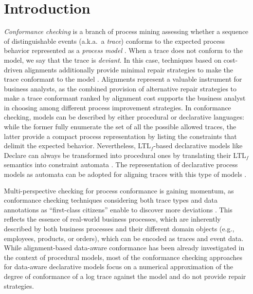 \section{Introduction}
\label{sec:introduction}

\textit{Conformance checking} is a branch of process mining assessing whether a sequence of distinguishable events (a.k.a.\ a \textit{trace}) conforms to the expected process behavior represented as a \textit{process model} \cite{RozinatA08}. When a trace does not conform to the model, we say that the trace is \textit{deviant}. In this case, techniques based on cost-driven alignments additionally provide minimal repair strategies to make the trace conformant to the model \cite{DBLP:conf/edoc/AdriansyahDA11}. Alignments represent a valuable instrument for business analysts, as the combined provision of alternative repair strategies to make a trace conformant ranked by alignment cost supports the business analyst in choosing among different process improvement strategies. In conformance checking, models can be described by either procedural or declarative languages: while the former fully enumerate the set of all the possible allowed traces, the latter provide a compact process representation by listing the constraints that delimit the expected behavior. Nevertheless, LTL$_f$-based declarative models like Declare \cite{DBLP:conf/edoc/PesicSA07} can always be transformed into procedural ones by translating their LTL$_f$ semantics into constraint automata \cite{Westergaard11}.
The representation of declarative process models as automata can be adopted for aligning traces with this type of models \cite{LeoniMA12,XuLZ17a}.


Multi-perspective checking for process conformance is gaining momentum, as conformance checking techniques considering both trace types and data annotations as ``first-class citizens'' enable to discover more deviations \cite{MultiPerspective}. This reflects the essence of real-world business processes, which are inherently described by both business processes and their different domain objects \cite{PetermannJMR14} (e.g., employees, products, or orders), which can be encoded as traces and event data. While alignment-based  data-aware conformance has been already investigated in the context of procedural models, most of the conformance checking approaches for data-aware declarative models \cite{BurattinMS16,Borrego014} focus on a numerical approximation of the degree of conformance of a log trace against the model and do not provide repair strategies.


